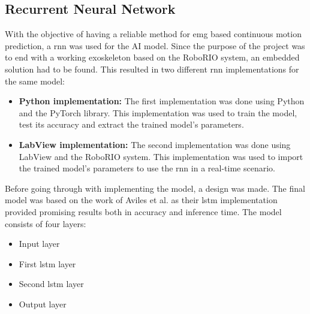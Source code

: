 \subsection{Recurrent Neural Network}
With the objective of having a reliable method for \acrshort{emg} based continuous motion prediction, a \acrshort{rnn} was used for the AI model. 
Since the purpose of the project was to end with a working exoskeleton based 
on the RoboRIO system, an embedded solution had to be found. This resulted in two different \acrshort{rnn} 
implementations for the same model:
\begin{itemize}

    \item \textbf{Python implementation:} The first implementation was done using Python and the PyTorch library. 
    This implementation was used to train the model, test its accuracy and extract the trained model's parameters.
    
    \item \textbf{LabView implementation:} The second implementation was done using LabView and the RoboRIO system. 
    This implementation was used to import the trained model's parameters to use the \acrshort{rnn} in a real-time scenario.

\end{itemize}

Before going through with implementing the model, a design was made. The final model was based on the work of Aviles et al. \cite{RNNEMG} 
as their \acrfull{lstm} implementation provided promising results both in accuracy and inference time. The model consists 
of four layers:
\begin{itemize}

    \item Input layer

    \item First \acrshort{lstm} layer

    \item Second \acrshort{lstm} layer
    
    \item Output layer

\end{itemize}

